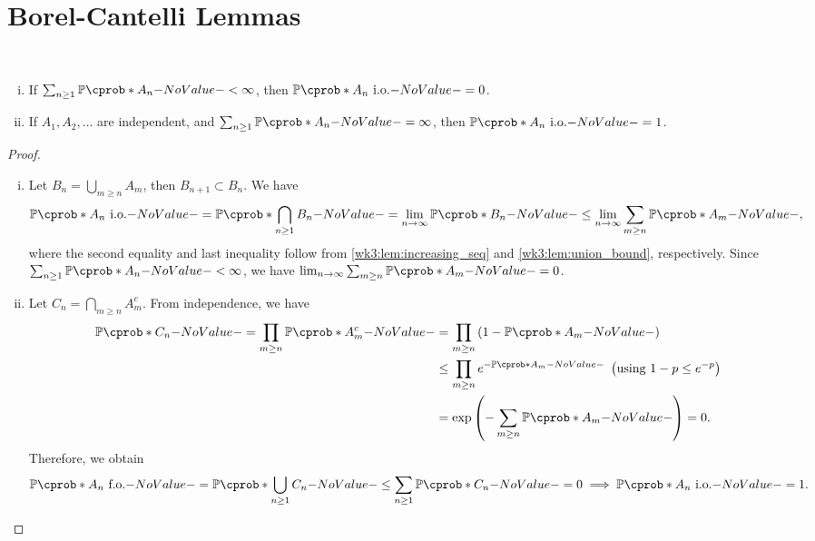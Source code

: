 \documentclass[12pt]{article}
\begin{document}
\section{Borel-Cantelli Lemmas}
\begin{Lemma} \label{wk6:lemma:borel_cantelli}\
\begin{enumerate}[(i)]
\item If $\sum_{n \geq 1} \P(A_n) < \infty$, then $\P(A_n \io)= 0$.
\item If $A_1, A_2, \ldots$ are independent, and $\sum_{n \geq 1} \P(A_n) = \infty$, then $\P(A_n \io) = 1$.
\end{enumerate}
\end{Lemma}
%
\begin{proof}\
\begin{enumerate}[(i)]
\item
Let $B_n = \bigcup_{m \geq n}A_m$, then $B_{n+1} \subset B_n$. We have
\begin{align*}
\P(A_n \io) 
= \P(\bigcap_{n \geq 1} B_n) 
= \lim_{n \to \infty} \P(B_n) 
\leq \lim_{n \to \infty} \sum_{m \geq n} \P(A_m),										
\end{align*}
where the second equality and last inequality follow from \cref{wk3:lem:increasing_seq} and \cref{wk3:lem:union_bound}, respectively. Since $\sum_{n \geq 1} \P(A_n) < \infty$, we have $\lim_{n \to \infty} \sum_{m \geq n} \P(A_m) = 0$.

\item
Let $C_n = \bigcap_{m \geq n} A_m^c$. From independence, we have
\begin{align*}
\P(C_n) 
= \prod_{m \geq n} \P(A_m^c)
&= \prod_{m \geq n} \left(1 - \P(A_m)\right) \\
&\leq \prod_{m \geq n} e^{-\P(A_m)} \ \left(\text{using }  1 - p \leq e^{-p}\right)	\\
&= \exp\left(-\sum_{m \geq n} \P(A_m)\right) = 0.	
\end{align*}
Therefore, we obtain
\begin{align*}
\P(A_n\ \text{f.o.}) = \P(\bigcup_{n \geq 1}C_n) \leq \sum_{n \geq 1} \P(C_n) = 0 \implies \P(A_n\io) = 1.
\end{align*}
\end{enumerate}
\end{proof}
\end{document}
